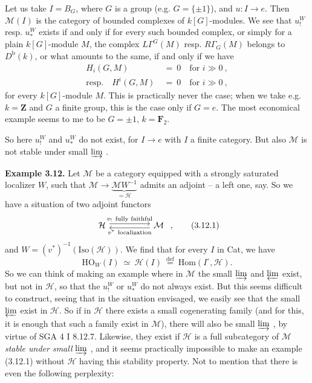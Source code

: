 \documentclass[11pt]{article}
\newcommand{\printedpage}[1]{\marginpar{\footnotesize p.~#1}}
\newcommand{\msp}[1]{\marginpar{\footnotesize [#1]}}
\newcommand{\limind}{\varinjlim}
\newcommand{\limproj}{\varprojlim}
\begin{document}
Let us take $I=B_G$, where $G$ is a group (e.g. $G=\{\pm1\}$), and $u : I \longrightarrow e$. Then $\mathcal{M}(I)$ is the category of bounded complexes of $k[G]$-modules. We see that $u_!^W$ resp. $u_*^W$ exists if and only if for every such bounded complex, or simply for a plain $k[G]$-module $M$, the complex $L\Gamma^G(M)$ resp. $R\Gamma_G(M)$ belongs to $D^{\mathrm{b}}(k)$, or what amounts to the same,
\printedpage{25}
if and only if we have
\[
\begin{aligned}
H_i(G,M) \ &= \ 0 \quad \text{for } i \gg 0 \ ,\\
\text{resp.}\quad H^i(G,M) \ &= \ 0 \quad \text{for } i \gg 0 \ ,
\end{aligned}
\]
for every $k[G]$-module $M$. This is practically never the case; when we take e.g. $k=\mathbf{Z}$ and $G$ a finite group, this is the case only if $G=e$. The most economical example seems to me to be $G=\pm1$, $k=\mathbf{F}_2$.

\msp{page 46}
So here $u_!^W$ and $u_*^W$ do not exist, for $I \longrightarrow e$ with $I$ a finite category. But also $\mathcal{M}$ is not stable under small $\limind$ .

\textbf{Example 3.12.} Let $\mathcal{M}$ be a category equipped with a strongly saturated localizer $W$, such that $\mathcal{M} \longrightarrow \underbrace{\mathcal{M}W^{-1}}_{=\mathcal{H}}$ admits an adjoint -- a left one, say. So we have a situation of two adjoint functors %
\[
\begin{tikzcd}[column sep=huge]
\mathcal{H} \arrow[r, shift left, "v_!\ \text{fully faithful}"] & \mathcal{M} \arrow[l, shift left, "v^*\ \text{localization}"]
\end{tikzcd}
\ , \tag*{(3.12.1)}
\]
and $W=(v^*)^{-1}(\mathrm{Iso}(\mathcal{H}))$. We find that for every $I$ in Cat, we have
\[
\mathrm{HO}_W(I) \ \simeq \ \mathcal{H}(I) \ \overset{\text{def}}{=} \ \mathrm{Hom}(I^\circ,\mathcal{H}). \tag*{(3.12.2)} %
\]
So we can think of making an example where in $\mathcal{M}$ the small $\limind$ and $\limproj$ exist, but not in $\mathcal{H}$, so that the $u_!^W$ or $u_*^W$ do not always exist. But this seems difficult to construct, seeing that in the situation envisaged, we easily see that the small $\limproj$ exist in $\mathcal{H}$. So if in $\mathcal{H}$ %
\msp{page 47}
there exists a small cogenerating family (and for this, it is enough that such a family exist in $\mathcal{M}$), there will also be small $\limind$ , by virtue of SGA 4 I 8.12.7. Likewise, they exist if $\mathcal{H}$ is a full subcategory of $\mathcal{M}$ \textit{stable under small} $\limind$ , and it seems practically impossible to make an example (3.12.1) without $\mathcal{H}$ having this stability property. Not to mention that there is even the following perplexity:
\end{document}
